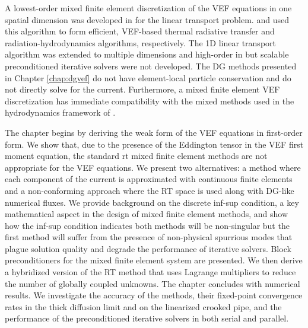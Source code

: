 \documentclass[../doc.tex]{subfiles}
\begin{document}
A lowest-order mixed finite element discretization of the VEF equations in one spatial dimension was developed in \cite{me} for the linear transport problem. \textcite{LOU2019258} and \textcite{LOU2021110393} used this algorithm to form efficient, VEF-based thermal radiative transfer and radiation-hydrodynamics algorithms, respectively. The 1D linear transport algorithm was extended to multiple dimensions and high-order in \cite{olivier_mandc} but scalable preconditioned iterative solvers were not developed. 
The DG methods presented in Chapter \ref{chap:dgvef} do not have element-local particle conservation and do not directly solve for the current. Furthermore, a mixed finite element VEF discretization has immediate compatibility with the mixed methods used in the hydrodynamics framework of \cite{blast}. 

The chapter begins by deriving the weak form of the VEF equations in first-order form. We show that, due to the presence of the Eddington tensor in the VEF first moment equation, the standard \gls{rt} mixed finite element methods are not appropriate for the VEF equations. We present two alternatives: a method where each component of the current is approximated with continuous finite elements and a non-conforming approach where the RT space is used along with DG-like numerical fluxes. 
We provide background on the discrete inf-sup condition, a key mathematical aspect in the design of mixed finite element methods, and show how the inf-sup condition indicates both methods will be non-singular but the first method will suffer from the presence of non-physical spurrious modes that plague solution quality and degrade the performance of iterative solvers. 
Block preconditioners for the mixed finite element system are presented. 
We then derive a hybridized version of the RT method that uses Lagrange multipliers to reduce the number of globally coupled unknowns. 
The chapter concludes with numerical results. We investigate the accuracy of the methods, their fixed-point convergence rates in the thick diffusion limit and on the linearized crooked pipe, and the performance of the preconditioned iterative solvers in both serial and parallel. 
\end{document}
